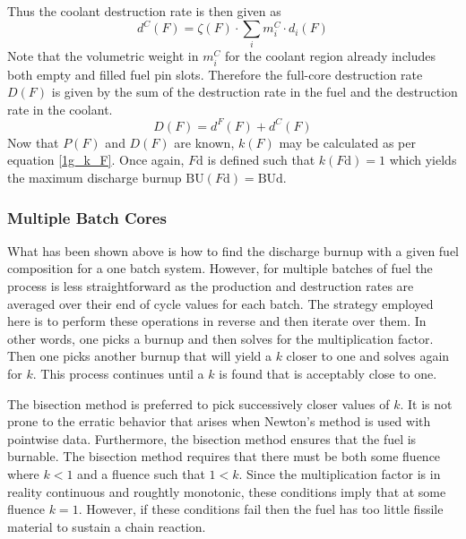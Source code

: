 Thus the coolant destruction rate is then given as
\begin{equation}
\label{1g_dC_F}
d^C(F) = \zeta(F) \cdot \sum_i m_i^C \cdot d_i(F)
\end{equation}
Note that the volumetric weight in $m_i^C$ for the coolant region already includes both 
empty and filled fuel pin slots.  Therefore the full-core destruction rate $D(F)$ is given by 
the sum of the destruction rate in the fuel and the destruction rate in the coolant.  
\begin{equation}
\label{1g_D_F}
D(F) = d^F(F) + d^C(F)
\end{equation}
Now that $P(F)$ and $D(F)$ are known, $k(F)$ may be calculated as per equation \ref{1g_k_F}.  
Once again, $F\mbox{d}$ is defined such that $k(F\mbox{d}) = 1$ which yields the maximum discharge 
burnup $\mbox{BU}(F\mbox{d}) = \mbox{BUd}$.




\subsubsection{Multiple Batch Cores}
\label{1g_sec:batch_ave}
What has been shown above is how to find the discharge burnup with a given fuel composition for a one
batch system.  However, for multiple batches of fuel the process is less straightforward as the 
production and destruction rates are averaged over their end of cycle values for each batch.  
The strategy employed here is to perform these operations in reverse and then iterate over them.  
In other words, one picks a burnup and then solves for the multiplication factor.  Then one picks 
another burnup that will yield a $k$ closer to one and solves again for $k$.  This process continues 
until a $k$ is found that is acceptably close to one.  

The bisection method is preferred to pick successively closer values of $k$.  It is not prone to the 
erratic behavior that arises when Newton's method is used with pointwise data.   Furthermore, the 
bisection method ensures that the fuel is burnable.  The bisection method requires that there must 
be both some fluence where $k < 1$ and a fluence such that $1 < k$.  Since the multiplication factor 
is in reality continuous and roughtly monotonic, these conditions imply that at some fluence $k = 1$.  
However, if these conditions fail then the fuel has too little fissile material to sustain a chain reaction. 

